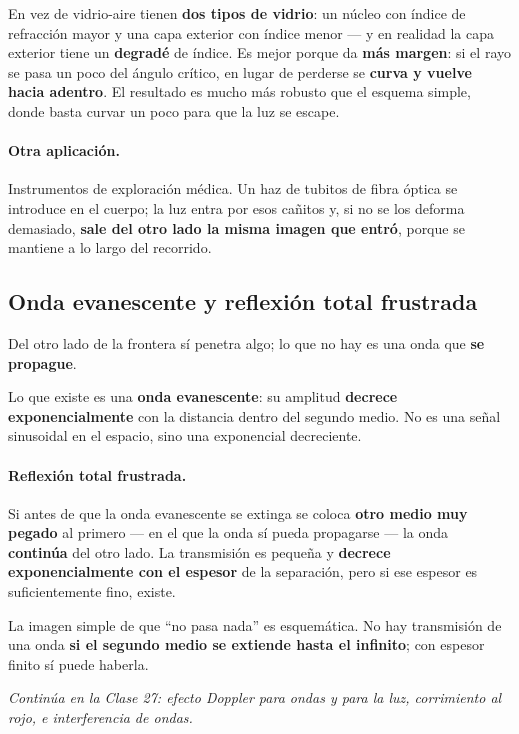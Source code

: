 \documentclass[12pt,a4paper]{article}
\begin{document}
\begin{notebox}
En vez de vidrio-aire tienen \textbf{dos tipos de vidrio}: un núcleo con índice de
refracción mayor y una capa exterior con índice menor --- y en realidad la capa
exterior tiene un \textbf{degradé} de índice. Es mejor porque da \textbf{más
margen}: si el rayo se pasa un poco del ángulo crítico, en lugar de perderse se
\textbf{curva y vuelve hacia adentro}. El resultado es mucho más robusto que el
esquema simple, donde basta curvar un poco para que la luz se escape.
\end{notebox}

\paragraph{Otra aplicación.}
Instrumentos de exploración médica. Un haz de tubitos de fibra óptica se
introduce en el cuerpo; la luz entra por esos cañitos y, si no se los deforma
demasiado, \textbf{sale del otro lado la misma imagen que entró}, porque se
mantiene a lo largo del recorrido.

\subsection{Onda evanescente y reflexión total frustrada}

\begin{warnbox}
Del otro lado de la frontera sí penetra algo; lo que no hay es una onda que
\textbf{se propague}.
\end{warnbox}

Lo que existe es una \textbf{onda evanescente}: su amplitud \textbf{decrece
exponencialmente} con la distancia dentro del segundo medio. No es una señal
sinusoidal en el espacio, sino una exponencial decreciente.

\paragraph{Reflexión total frustrada.}
Si antes de que la onda evanescente se extinga se coloca \textbf{otro medio muy
pegado} al primero --- en el que la onda sí pueda propagarse --- la onda
\textbf{continúa} del otro lado. La transmisión es pequeña y \textbf{decrece
exponencialmente con el espesor} de la separación, pero si ese espesor es
suficientemente fino, existe.

\begin{notebox}[Lectura]
La imagen simple de que \enquote{no pasa nada} es esquemática. No hay transmisión
de una onda \textbf{si el segundo medio se extiende hasta el infinito}; con
espesor finito sí puede haberla.
\end{notebox}

\vspace{1em}
\noindent\emph{Continúa en la Clase 27: efecto Doppler para ondas y para la luz,
corrimiento al rojo, e interferencia de ondas.}
\end{document}
